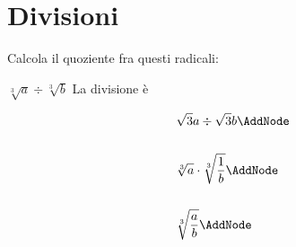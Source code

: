 \section{Divisioni}
Calcola il quoziente fra questi radicali:
\tcbstartrecording
\begin{exercise}
	$\sqrt[3]{a}\div\sqrt[3]{b}$
	\tcblower
	La divisione è
	\begin{NodesList}
		\begin{align*}
		&\sqrt{3}{a}\div\sqrt{3}{b} \AddNode\\
		&\\
		&\sqrt[3]{a}\cdot\sqrt[3]{\dfrac{1}{b}} \AddNode\\
		&\\
		&\sqrt[3]{\dfrac{a}{b}} \AddNode
		\end{align*}
					
				\end{NodesList}
			\end{exercise}
			
